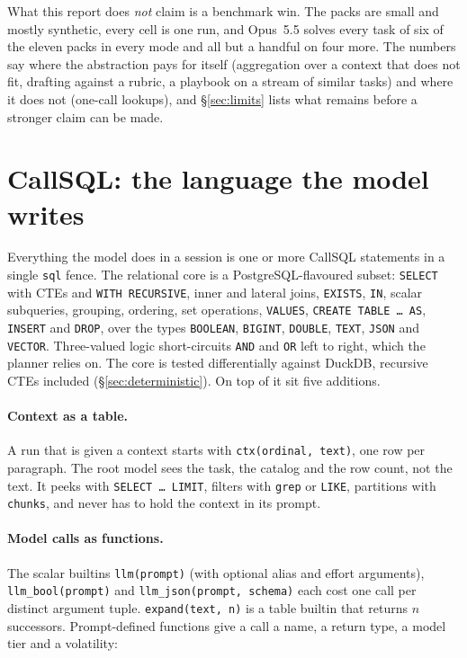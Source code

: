\documentclass[11pt,a4paper]{article}
\newcommand{\callsql}{CallSQL}
\newcommand{\code}[1]{\texttt{#1}}
\begin{document}
What this report does \emph{not} claim is a benchmark win. The packs are
small and mostly synthetic, every cell is one run, and Opus~5.5 solves
every task of six of the eleven packs in every mode and all but a handful
on four more. The numbers say where the abstraction pays for itself
(aggregation over a context that does not fit, drafting against a rubric,
a playbook on a stream of similar tasks) and where it does not (one-call
lookups), and \S\ref{sec:limits} lists what remains before a stronger claim
can be made.

\section{\callsql: the language the model writes}
\label{sec:callsql}

Everything the model does in a session is one or more \callsql{} statements in a
single \code{sql} fence. The relational core is a PostgreSQL-flavoured subset:
\code{SELECT} with CTEs and \code{WITH RECURSIVE}, inner and lateral joins,
\code{EXISTS}, \code{IN}, scalar subqueries, grouping, ordering, set operations,
\code{VALUES}, \code{CREATE TABLE \ldots{} AS}, \code{INSERT} and \code{DROP}, over
the types \code{BOOLEAN}, \code{BIGINT}, \code{DOUBLE}, \code{TEXT}, \code{JSON}
and \code{VECTOR}. Three-valued logic short-circuits \code{AND} and \code{OR}
left to right, which the planner relies on. The core is tested differentially
against DuckDB, recursive CTEs included (\S\ref{sec:deterministic}). On top of
it sit five additions.

\paragraph{Context as a table.} A run that is given a context starts with
\code{ctx(ordinal, text)}, one row per paragraph. The root model sees the task,
the catalog and the row count, not the text. It peeks with \code{SELECT \ldots{}
LIMIT}, filters with \code{grep} or \code{LIKE}, partitions with \code{chunks},
and never has to hold the context in its prompt.

\paragraph{Model calls as functions.} The scalar builtins \code{llm(prompt)}
(with optional alias and effort arguments), \code{llm\_bool(prompt)} and
\code{llm\_json(prompt, schema)} each cost one call per distinct argument tuple. \code{expand(text, n)} is a table
builtin that returns $n$ successors. Prompt-defined functions give a call a name,
a return type, a model tier and a volatility:
\end{document}

